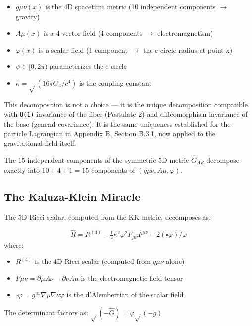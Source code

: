 \documentclass[aps,prd,preprint,superscriptaddress,longbibliography,floatfix]{revtex4-2}
\theoremstyle{remark}
\begin{document}
\begin{itemize}
  \item $g\mu\nu(x)$ is the 4D spacetime metric (10 independent components $\to$ gravity)
  \item $A\mu(x)$ is a 4-vector field (4 components $\to$ electromagnetism)
  \item $\varphi(x)$ is a scalar field (1 component $\to$ the e-circle radius at point x)
  \item $\psi \in [0, 2\pi)$ parameterizes the e-circle
  \item $\kappa = \sqrt{}(16\pi G_{4}/c^{4})$ is the coupling constant
\end{itemize}

This decomposition is not a choice --- it is the unique decomposition compatible with \texttt{U(1)} invariance of the fiber (Postulate 2) and diffeomorphism invariance of the base (general covariance). It is the same uniqueness established for the particle Lagrangian in Appendix B, Section B.3.1, now applied to the gravitational field itself.

The 15 independent components of the symmetric 5D metric $\hat{G}_{AB}$ decompose exactly into $10 + 4 + 1 = 15$ components of $(g\mu\nu, A\mu, \varphi)$.



\subsection{The Kaluza-Klein Miracle}

The 5D Ricci scalar, computed from the KK metric, decomposes as:


\begin{equation}
    \hat{R} = R^{(4)} - \tfrac{1}{4}\kappa^{2}\varphi^{2} F_{\mu\nu}F^{\mu\nu} - 2(\square\varphi)/\varphi
\end{equation}
where:

\begin{itemize}
  \item $R^{(4)}$ is the 4D Ricci scalar (computed from $g\mu\nu$ alone)
  \item $F\mu\nu = \partial\mu A\nu - \partial\nu A\mu$ is the electromagnetic field tensor
  \item $\square\varphi = g^{uv}\nabla\mu\nabla\nu\varphi$ is the d'Alembertian of the scalar field
\end{itemize}

The determinant factors as: $\sqrt{}(-\hat{G}) = \varphi \sqrt{}(-g)$
\end{document}
